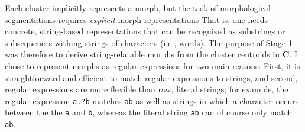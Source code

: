 Each cluster implicitly represents a morph, but the task of morphological segmentations requires \emph{explicit} morph representations
 That is, one needs concrete, string-based representations that can be recognized as substrings or subsequences withing strings of characters (i.e., words). 
The purpose of Stage 1 was therefore to derive string-relatable morphs from the cluster centroids in $\mathbf{C}$.
I chose to represent morphs as regular expressions for two main reasons: First, it is straightforward and efficient to match regular expressions to strings, and second, regular expressions are more flexible than raw, literal strings; for example, the regular expression 
\texttt{a.?b} matches \texttt{ab} as well as strings in which a character occurs between the 
the \texttt{a} and \texttt{b}, whereas the literal string \texttt{ab} can of course only match \texttt{ab}.  


